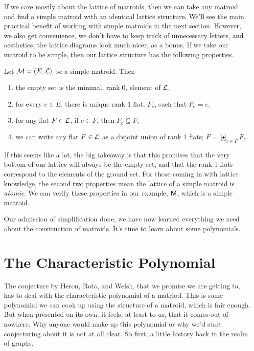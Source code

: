 \documentclass[12pt,oneside]{../../sfsuthesis}
\begin{document}
If we care mostly about the lattice of matroids, then we can take any matroid and find a simple matroid with an identical lattice structure.
We'll see the main practical benefit of working with simple matroids in the next section.
However, we also get convenience, we don't have to keep track of unnecessary letters, and aesthetics, the lattice diagrams look much nicer, as a bonus.
If we take our matroid to be simple, then our lattice structure has the following properties.

\begin{proposition}\th\label{thm:simpMatroidProps}
    Let \( \mathcal{M} = (E, \mathcal{L}) \) be a simple matroid.
    Then
    \begin{enumerate}[label=\roman*.]
        \item the empty set is the minimal, rank 0, element of \( \mathcal{L} \),
        \item for every \( e \in E \), there is unique rank 1 flat, \( F_e \), such that \( F_e = e \),
        \item for any flat \( F \in \mathcal{L} \), if \( e \in F \), then \( F_e \subseteq F \),
        \item we can write any flat \( F \in \mathcal{L} \) as a disjoint union of rank 1 flats; \( F = \biguplus_{e \in F}F_e \).
    \end{enumerate}
\end{proposition}

If this seems like a lot, the big takeaway is that this promises that the very bottom of our lattice will always be the empty set, and that the rank 1 flats correspond to the elements of the ground set.
For those coming in with lattice knowledge, the second two properties mean the lattice of a simple matroid is \emph{atomic}.
We can verify these properties in our example, \( \mathsf{M} \), which is a simple matroid.

Our admission of simplification done, we have now learned everything we need about the construction of matroids.
It's time to learn about some polynomials.

\section{The Characteristic Polynomial}

The conjecture by Heron, Rota, and Welsh, that we promise we are getting to, has to deal with the characteristic polynomial of a matriod.
This is some polynomial we can cook up using the structure of a matroid, which is fair enough.
But when presented on its own, it feels, at least to us, that it comes out of nowhere.
Why anyone would make up this polynomial or why we'd start conjecturing about it is not at all clear.
So first, a little history back in the realm of graphs.
\end{document}
